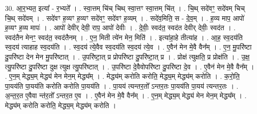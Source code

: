 \documentclass[17pt]{extarticle}
\begin{document}
30. आ॒र॒भ्यत॒ इत्या᳚ - र॒भ्यते᳚ । . स्वा॒त्तम् चि॑च् चिथ् स्वा॒त्तꣳ स्वा॒त्तम् चि॑त् । . चि॒थ् सदे॑वꣳ॒॒ सदे॑वम् चिच् चि॒थ् सदे॑वम् । . सदे॑वꣳ ह॒व्यꣳ ह॒व्यꣳ सदे॑वꣳ॒॒ सदे॑वꣳ ह॒व्यम् । . सदे॑व॒मिति॒ स - दे॒व॒म् । . ह॒व्य माप॒ आपो॑ ह॒व्यꣳ ह॒व्य मापः॑ । . आपो॑ देवीर् देवी॒ राप॒ आपो॑ देवीः । . दे॒वीः॒ स्वद॑त॒ स्वद॑त देवीर् देवीः॒ स्वद॑त । . स्वद॑तैन मेनꣳ॒॒ स्वद॑त॒ स्वद॑तैनम् । . ए॒न॒ मिती त्ये॑न मेन॒ मिति॑ । . इत्या॑हा॒हे तीत्या॑ह । . आ॒ह॒ स्व॒दय॑ति स्व॒दय॑ त्याहाह स्व॒दय॑ति । . स्व॒दय॑ त्ये॒वैव स्व॒दय॑ति स्व॒दय॑ त्ये॒व । . ए॒वैन॑ मेन मे॒वै वैन᳚म् । . ए॒न॒ मु॒परि॑ष्टा दु॒परि॑ष्टा देन मेन मु॒परि॑ष्टात् । . उ॒परि॑ष्टा॒त् प्र प्रोपरि॑ष्टा दु॒परि॑ष्टा॒त् प्र । . प्रोक्ष॑ त्युक्षति॒ प्र प्रोक्ष॑ति । . उ॒क्ष॒ त्यु॒परि॑ष्टा दु॒परि॑ष्टा दुक्ष त्युक्ष त्यु॒परि॑ष्टात् । . उ॒परि॑ष्टा दे॒वैवोपरि॑ष्टा दु॒परि॑ष्टा दे॒व । . ए॒वैन॑ मेन मे॒वै वैन᳚म् । . ए॒न॒म् मेद्ध्य॒म् मेद्ध्य॑ मेन मेन॒म् मेद्ध्य᳚म् । . मेद्ध्य॑म् करोति करोति॒ मेद्ध्य॒म् मेद्ध्य॑म् करोति । . क॒रो॒ति॒ पा॒यय॑ति पा॒यय॑ति करोति करोति पा॒यय॑ति । . पा॒यय॑ त्यन्तर॒तो᳚ ऽन्तर॒तः पा॒यय॑ति पा॒यय॑ त्यन्तर॒तः । . अ॒न्त॒र॒त ए॒वैवा न्त॑र॒तो᳚ ऽन्तर॒त ए॒व । . ए॒वैन॑ मेन मे॒वै वैन᳚म् । . ए॒न॒म् मेद्ध्य॒म् मेद्ध्य॑ मेन मेन॒म् मेद्ध्य᳚म् । . मेद्ध्य॑म् करोति करोति॒ मेद्ध्य॒म् मेद्ध्य॑म् करोति । \newline
\end{document}
